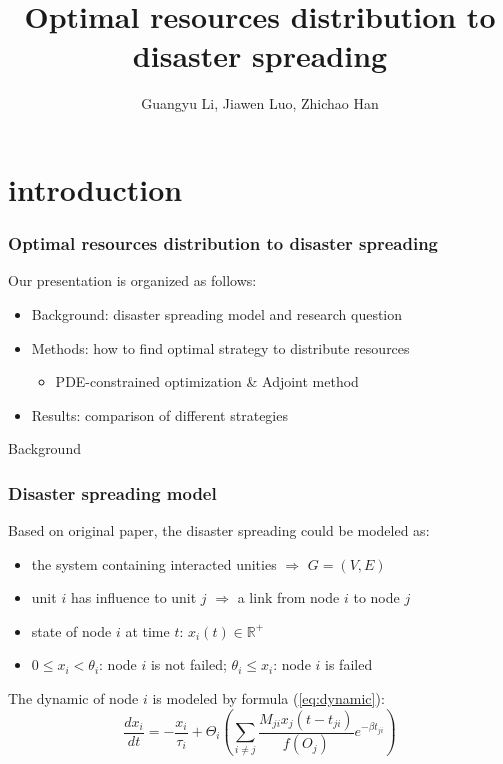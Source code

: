 \documentclass{beamer}
\author{Guangyu Li, Jiawen Luo, Zhichao Han}
\title{Optimal resources distribution to disaster spreading}
\date{}
\begin{document}
\titleframe



\section{introduction}
\begin{frame}
	\frametitle{Optimal resources distribution to disaster spreading}
	Our presentation is organized as follows:

	\begin{itemize}
		\setlength\itemsep{1em}
		\item Background: disaster spreading model and research question
		\item Methods: how to find optimal strategy to distribute resources
		\begin{itemize}
			\item PDE-constrained optimization \& Adjoint method
		\end{itemize}

		\item Results: comparison of different strategies
	\end{itemize}
\end{frame}

\begin{frame}
\begin{center}
	\Huge Background
\end{center}
\end{frame}

\begin{frame}
	\frametitle{Disaster spreading model}
	Based on original paper\footnotemark[1]
	, the disaster spreading could be modeled as:
	\begin{itemize}
		\item the system containing interacted unities $\Rightarrow$ $G=(V, E)$
		\item unit $i$ has influence to unit $j$ $\Rightarrow$ a link from node $i$ to node $j$
		\item state of node $i$ at time $t$: $x_i(t) \in \mathbb{R}^{+}$
		\item $0\leq x_i< \theta_i$: node $i$ is not failed; $\theta_i \leq x_i$: node $i$ is failed
	\end{itemize}
	The dynamic of node $i$ is modeled by formula (\ref{eq:dynamic}):
	\begin{equation}
		\label{eq:dynamic}
		\frac{dx_i}{dt} = - \frac{x_i}{\tau_i} + \Theta_i ( \sum_{i\neq j}\frac{M_{ji}x_j(t-t_{ji})}{f(O_j)} e^{-\beta t_{ji}} )
	\end{equation}
\end{frame}
\end{document}
